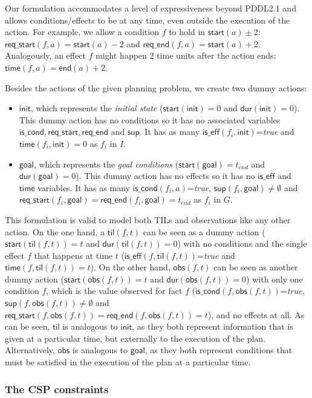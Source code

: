 \documentclass{ecai}
\newcommand{\dur}{\mathsf{dur}}    %
\newcommand{\iscond}{\mathsf{is\_cond}}    %
\newcommand{\iseff}{\mathsf{is\_eff}}    %
\newcommand{\obs}{\mathsf{obs}}    %
\newcommand{\start}{\mathsf{start}}%
\newcommand{\en}{\mathsf{end}}     %
\newcommand{\til}{\mathsf{til}}    %
\newcommand{\supp}{\mathsf{sup}}   %
\newcommand{\tim}{\mathsf{time}}   %
\newcommand{\reqs}{\mathsf{req\_{start}}} %
\newcommand{\reqe}{\mathsf{req\_{end}}}   %
\newcommand{\ini}{\mathsf{init}}   %
\newcommand{\goal}{\mathsf{goal}}  %
\begin{document}
Our formulation accommodates a level of expressiveness beyond PDDL2.1 and allows conditions/effects to be at any time, even outside the execution of the action. For example, we allow a condition $f$ to hold in $\start(a)\pm$2: $\reqs(f,a)=\start(a)-2$ and $\reqe(f,a)=\start(a)+2$. Analogously, an effect $f$ might happen 2 time units after the action ends: $\tim(f,a)=\en(a)+2$.


Besides the actions of the given planning problem, we create two dummy actions:

\begin{itemize}
	
\item $\ini$, which represents the {\em initial state} ($\start(\ini)=0$ and $\dur(\ini)=0$). This dummy action has no conditions so it has no associated variables $\iscond, \reqs, \reqe$ and $\supp$. It has as many $\iseff(f_i,\ini)$=\textit{true} and $\tim(f_i,\ini)=0$ as $f_i$ in $I$.

\item $\goal$, which represents the {\em goal conditions} ($\start(\goal)=t_{end}$ and $\dur(\goal)=0$). This dummy action has no effects so it has no $\iseff$ and $\tim$ variables. It has as many $\iscond(f_i,a)$=\textit{true}, $\supp(f_i,\goal)\neq \emptyset$ and $\reqs(f_i,\goal)=\reqe(f_i,\goal)=t_{end}$ as $f_i$ in $G$. 
\end{itemize}  


This formulation is valid to model both TILs and observations like any other action. On the one hand, a $\til(f,t)$ can be seen as a dummy action ($\start(\til(f,t))=t$ and $\dur(\til(f,t))=0$) with no conditions and the single effect $f$ that happens at time $t$ ($\iseff(f,\til(f,t))$=\textit{true} and $\tim(f,\til(f,t))=t$). 
On the other hand, $\obs(f,t)$ can be seen as another dummy action ($\start(\obs(f,t))=t$ and $\dur(\obs(f,t))=0$) with only one condition $f$, which is the value observed for fact $f$ ($\iscond(f,\obs(f,t))$=\textit{true}, $\supp(f,\obs(f,t))\neq \emptyset$ and $\reqs(f,\obs(f,t))=\reqe(f,\obs(f,t))=t$), and no effects at all. 
As can be seen, $\til$ is analogous to $\ini$, as they both represent information that is given at a particular time, but externally to the execution of the plan. Alternatively, $\obs$ is analogous to $\goal$, as they both represent conditions that must be satisfied in the execution of the plan at a particular time.



\subsubsection{The CSP constraints}
\label{section:CSPconstraints}
\end{document}
